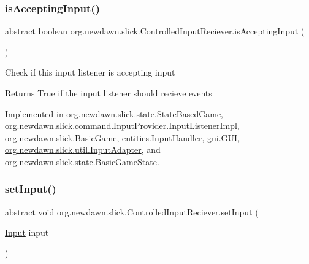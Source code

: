 \subsubsection{\texorpdfstring{is\+Accepting\+Input()}{isAcceptingInput()}}
{\footnotesize\ttfamily abstract boolean org.\+newdawn.\+slick.\+Controlled\+Input\+Reciever.\+is\+Accepting\+Input (\begin{DoxyParamCaption}{ }\end{DoxyParamCaption})\hspace{0.3cm}{\ttfamily [abstract]}}

Check if this input listener is accepting input

\begin{DoxyReturn}{Returns}
True if the input listener should recieve events 
\end{DoxyReturn}


Implemented in \mbox{\hyperlink{classorg_1_1newdawn_1_1slick_1_1state_1_1_state_based_game_ab5c47ea171308ec7dac850d2739d79e4}{org.\+newdawn.\+slick.\+state.\+State\+Based\+Game}}, \mbox{\hyperlink{classorg_1_1newdawn_1_1slick_1_1command_1_1_input_provider_1_1_input_listener_impl_aafacc541954726a57251f0893750a9e4}{org.\+newdawn.\+slick.\+command.\+Input\+Provider.\+Input\+Listener\+Impl}}, \mbox{\hyperlink{classorg_1_1newdawn_1_1slick_1_1_basic_game_a435f5bb90065a05563b04b715f02891e}{org.\+newdawn.\+slick.\+Basic\+Game}}, \mbox{\hyperlink{classentities_1_1_input_handler_a3b0b01f1e82200097d90346ebe12e369}{entities.\+Input\+Handler}}, \mbox{\hyperlink{classgui_1_1_g_u_i_a0d50e235ccee27aa0e35b860cd5dc883}{gui.\+G\+UI}}, \mbox{\hyperlink{classorg_1_1newdawn_1_1slick_1_1util_1_1_input_adapter_a8f20e7fc464c8f8f7a676b041e691765}{org.\+newdawn.\+slick.\+util.\+Input\+Adapter}}, and \mbox{\hyperlink{classorg_1_1newdawn_1_1slick_1_1state_1_1_basic_game_state_adc09c433d4eb497616ac73c55b8b6c7d}{org.\+newdawn.\+slick.\+state.\+Basic\+Game\+State}}.

\mbox{\label{interfaceorg_1_1newdawn_1_1slick_1_1_controlled_input_reciever_ab838ca221a429b05c0b53aea9b4fe72f}} 
\subsubsection{\texorpdfstring{set\+Input()}{setInput()}}
{\footnotesize\ttfamily abstract void org.\+newdawn.\+slick.\+Controlled\+Input\+Reciever.\+set\+Input (\begin{DoxyParamCaption}\item[{\mbox{\hyperlink{classorg_1_1newdawn_1_1slick_1_1_input}{Input}}}]{input }\end{DoxyParamCaption})\hspace{0.3cm}{\ttfamily [abstract]}}


